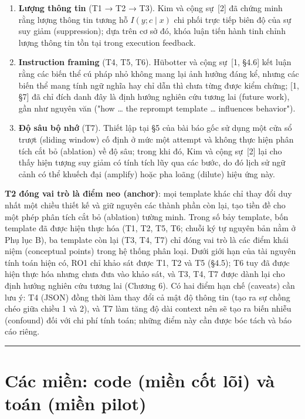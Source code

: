 \begin{enumerate}
\def\labelenumi{\arabic{enumi}.}
\tightlist
\item
  \textbf{Lượng thông tin} (T1 → T2 → T3). Kim và cộng sự~{[}2{]} đã chứng minh rằng lượng thông tin tương hỗ \(I(y; c \mid x)\) chi phối trực tiếp biên độ của sự suy giảm (suppression); dựa trên cơ sở đó, khóa luận tiến hành tinh chỉnh lượng thông tin tồn tại trong execution feedback.
\item
  \textbf{Instruction framing} (T4, T5, T6). Hübotter và cộng sự~{[}1, §4.6{]} kết luận rằng các biến thể cú pháp nhỏ không mang lại ảnh hưởng đáng kể, nhưng các biến thể mang tính ngữ nghĩa hay chỉ dẫn thì chưa từng được kiểm chứng; {[}1, §7{]} đã chỉ đích danh đây là định hướng nghiên cứu tương lai (future work), gần như nguyên văn ("how \ldots{} the reprompt template \ldots{} influences behavior").
\item
  \textbf{Độ sâu bộ nhớ} (T7). Thiết lập tại §5 của bài báo gốc sử dụng một cửa sổ trượt (sliding window) cố định ở mức một attempt và không thực hiện phân tích cắt bỏ (ablation) về độ sâu; trong khi đó, Kim và cộng sự~{[}2{]} lại cho thấy hiện tượng suy giảm có tính tích lũy qua các bước, do đó lịch sử ngữ cảnh có thể khuếch đại (amplify) hoặc pha loãng (dilute) hiệu ứng này.
\end{enumerate}

\textbf{T2 đóng vai trò là điểm neo (anchor)}: mọi template khác chỉ thay đổi duy nhất một chiều thiết kế và giữ nguyên các thành phần còn lại, tạo tiền đề cho một phép phân tích cắt bỏ (ablation) tường minh. Trong số bảy template, bốn template đã được hiện thực hóa (T1, T2, T5, T6; chuỗi ký tự nguyên bản nằm ở Phụ lục B), ba template còn lại (T3, T4, T7) chỉ đóng vai trò là các điểm khái niệm (conceptual points) trong hệ thống phân loại. Dưới giới hạn của tài nguyên tính toán hiện có, RO1 chỉ khảo sát được T1, T2 và T5 (§4.5); T6 tuy đã được hiện thực hóa nhưng chưa đưa vào khảo sát, và T3, T4, T7 được dành lại cho định hướng nghiên cứu tương lai (Chương 6). Có hai điểm hạn chế (caveats) cần lưu ý: T4 (JSON) đồng thời làm thay đổi cả mật độ thông tin (tạo ra sự chồng chéo giữa chiều 1 và 2), và T7 làm tăng độ dài context nên sẽ tạo ra biến nhiễu (confound) đối với chi phí tính toán; những điểm này cần được bóc tách và báo cáo riêng.

\begin{center}\rule{0.5\linewidth}{0.5pt}\end{center}

\section{Các miền: code (miền cốt lõi) và toán (miền pilot)}\label{domains-code-core-and-math-pilot}

